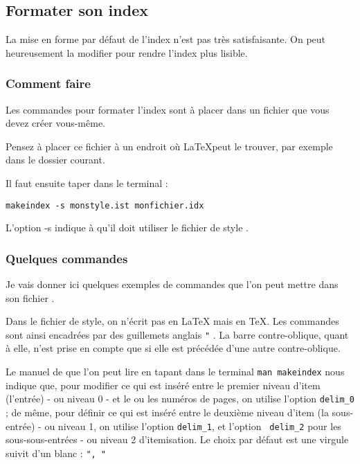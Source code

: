 \subsection{Formater son index}

La mise en forme par défaut de l'index n'est pas très satisfaisante. On peut heureusement la modifier pour rendre l'index plus lisible.


\subsubsection{Comment faire}
Les commandes pour formater l'index sont à placer dans un fichier  que vous devez créer vous-même.

\begin{attention}
Pensez à placer ce fichier à un endroit où \LaTeX peut le trouver, par exemple dans le dossier courant. 
\end{attention}

Il faut ensuite taper dans le terminal :
\begin{verbatim}
makeindex -s monstyle.ist monfichier.idx
\end{verbatim}

L'option -s indique à   qu'il doit utiliser le fichier de style  .

\subsubsection{Quelques commandes}

Je vais donner ici quelques exemples de commandes que l'on peut mettre dans son fichier . 

\begin{attention}
Dans le fichier de style, on n'écrit pas en \LaTeX{} mais en \TeX . Les commandes sont ainsi encadrées par des guillemets anglais \verb|"| . La barre contre-oblique, quant à elle, n'est prise en compte que si elle est précédée d'une autre contre-oblique.
\end{attention}

Le manuel de  que l'on peut lire en tapant dans le terminal \verb+man makeindex+ nous indique que, pour modifier ce qui est inséré entre le premier niveau d'item (l'entrée) - ou niveau 0 -  et le ou les numéros de pages, on utilise l'option \verb|delim_0| ; de même, pour définir ce qui est inséré entre le deuxième niveau d'item (la sous-entrée) - ou niveau 1, on utilise l'option \verb+delim_1+, et l'option \verb| delim_2| pour les sous-sous-entrées - ou niveau 2 d'itemisation. Le choix par défaut est une virgule suivit d'un blanc : \verb|", "|

